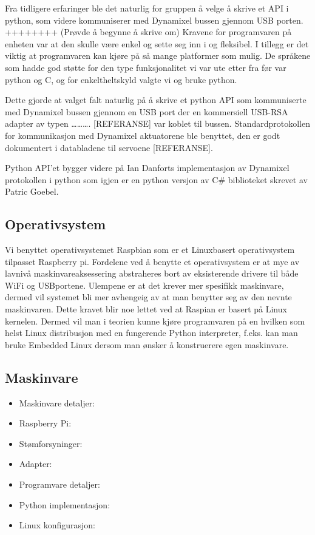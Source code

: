 \documentclass[12pt]{report}
\begin{document}
Fra tidligere erfaringer ble det naturlig for gruppen å velge å skrive et API i python, som videre kommuniserer med Dynamixel bussen gjennom USB porten. ++++++++
(Prøvde å begynne å skrive om) 
Kravene for programvaren på enheten var at den skulle være enkel og sette seg inn i og fleksibel. I tillegg er det viktig at programvaren kan kjøre på så mange platformer som mulig. De språkene som hadde god støtte for den type funksjonalitet vi var ute etter fra før var python og C, og for enkeltheltskyld valgte vi og bruke python.

Dette gjorde at valget falt naturlig på å skrive et python API som kommuniserte med Dynamixel bussen gjennom en USB port der en kommersiell USB-RSA adapter av typen ………. [REFERANSE] var koblet til bussen. Standardprotokollen for kommunikasjon med Dynamixel aktuatorene ble benyttet, den er godt dokumentert i databladene til servoene [REFERANSE]. 

Python API’et bygger videre på Ian Danforts implementasjon av Dynamixel protokollen i python som igjen er en python versjon av C\# biblioteket skrevet av Patric Goebel.

\subsection{Operativsystem}
Vi benyttet operativsystemet Raspbian som er et Linuxbasert operativsystem tilpasset Raspberry pi. Fordelene ved å benytte et operativsystem er at mye av lavnivå maskinvareaksessering abstraheres bort av eksisterende drivere til både WiFi og USBportene. Ulempene er at det krever mer spesifikk maskinvare, dermed vil systemet bli mer avhengeig av at man benytter seg av den nevnte maskinvaren. Dette kravet blir noe lettet ved at Raspian er basert på Linux kernelen. Dermed vil man i teorien kunne kjøre programvaren på en hvilken som helst Linux distribusjon med en fungerende Python interpreter, f.eks. kan man bruke Embedded Linux dersom man ønsker å konstruerere egen maskinvare.

\subsection{Maskinvare}

\begin{itemize}
	\item Maskinvare detaljer:
	\item Raspberry Pi:
	\item Stømforsyninger:
	\item Adapter:
	\item Programvare detaljer:
	\item Python implementasjon:
	\item Linux konfigurasjon:

\end{itemize}
\end{document}
